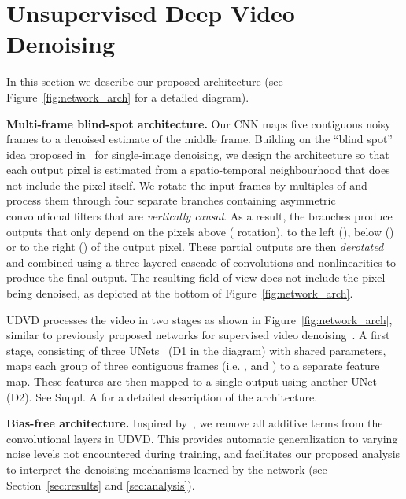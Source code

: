 \documentclass[final]{cvpr}
\begin{document}
\section{Unsupervised Deep Video Denoising}
\label{sec:methodology}
In this section we describe our proposed architecture (see Figure~\ref{fig:network_arch} for a detailed diagram). 

\noindent \textbf{Multi-frame blind-spot architecture.} Our CNN maps five contiguous noisy frames to a denoised estimate of the middle frame. Building on the ``blind spot'' idea proposed in~\cite{blindspotnet} for single-image denoising, we design the architecture so that each output pixel is estimated from a spatio-temporal neighbourhood that does not include the pixel itself. 
We rotate the input frames by multiples of  and process them through four separate branches containing asymmetric convolutional filters that are \emph{vertically causal}. As a result, the branches produce outputs that only depend on the pixels above ( rotation), to the left (), below () or to the right () of the output pixel. These partial outputs are then \emph{derotated} and combined using a three-layered cascade of  convolutions and nonlinearities to produce the final output. The resulting field of view does not include the pixel being denoised, as depicted at the bottom of Figure~\ref{fig:network_arch}. 

UDVD processes the video in two stages as shown in Figure~\ref{fig:network_arch}, similar to previously proposed networks for supervised video denoising~\cite{dvdnet, videnn, fastdvdnet}. A first stage, consisting of three UNets~\cite{ronneberger2015u} (D1 in the diagram) with shared parameters, maps each group of three contiguous frames (i.e. ,  and ) to a separate feature map. These features are then mapped to a single output using another UNet (D2). See Suppl. A for a detailed description of the architecture. 

\noindent \textbf{Bias-free architecture.} 
Inspired by~\cite{biasfree}, we remove all additive terms from the convolutional layers in UDVD. This provides automatic generalization to varying noise levels not encountered during training, and facilitates our proposed analysis to interpret the denoising mechanisms learned by the network (see Section~\ref{sec:results} and \ref{sec:analysis}).
\end{document}
